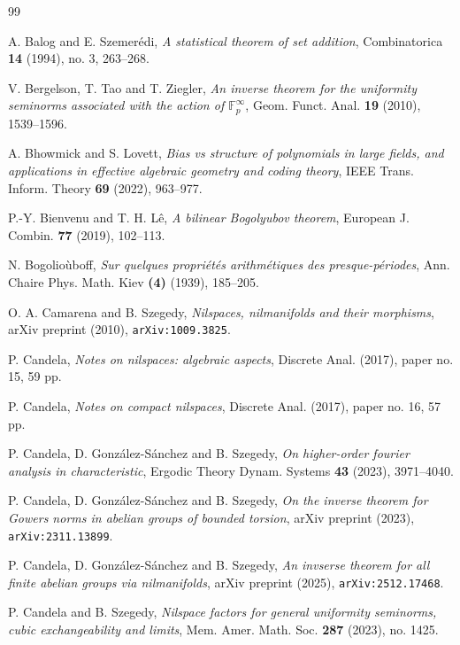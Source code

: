 \documentclass[a4paper,11pt]{article}
\numberwithin{theorem}{section}
\theoremstyle{definition}
\renewenvironment{thebibliography}[1]
{
  \begin{oldthebibliography}{#1}
    \setlength{\itemsep}{0em  plus 0.3ex}
    \setlength{\parskip}{0em}
}
{
  \end{oldthebibliography}
}
\begin{document}
\begin{thebibliography}{99}
 A. Balog and E. Szemer\'edi, \textit{A statistical theorem of set addition}, Combinatorica \textbf{14} (1994), no. 3, 263--268.

 V. Bergelson, T. Tao and T. Ziegler, \emph{An inverse theorem for the uniformity seminorms associated with the action of $\mathbb{F}_p^\infty$}, Geom. Funct. Anal. \textbf{19} (2010), 1539--1596.

 A. Bhowmick and S. Lovett, \emph{Bias vs structure of polynomials in large fields, and applications in effective algebraic geometry and coding theory}, IEEE Trans. Inform. Theory \textbf{69} (2022), 963--977. 

 P.-Y. Bienvenu and T. H. L\^{e}, \emph{A bilinear Bogolyubov theorem}, European J. Combin. \textbf{77} (2019), 102--113.

 N. Bogolio\`uboff, \textit{Sur quelques propri\'et\'es arithm\'etiques des presque-p\'eriodes}, Ann. Chaire Phys. Math. Kiev \textbf{(4)} (1939), 185--205.

 O. A. Camarena and B. Szegedy, \emph{Nilspaces, nilmanifolds and their morphisms}, arXiv preprint (2010), \verb+arXiv:1009.3825+.

 P. Candela, \emph{Notes on nilspaces: algebraic aspects}, Discrete Anal. (2017), paper no. 15, 59 pp.

 P. Candela, \emph{Notes on compact nilspaces}, Discrete Anal. (2017), paper no. 16, 57 pp.

 P. Candela, D. Gonz\'alez-S\'anchez and B. Szegedy, \emph{On higher-order fourier analysis in characteristic}, Ergodic Theory Dynam. Systems \textbf{43} (2023), 3971--4040.

 P. Candela, D. Gonz\'alez-S\'anchez and B. Szegedy, \textit{On the inverse theorem for Gowers norms in abelian groups of bounded torsion}, arXiv preprint (2023), \verb+arXiv:2311.13899+.

 P. Candela, D. Gonz\'alez-S\'anchez and B. Szegedy, \textit{An invserse theorem for all finite abelian groups via nilmanifolds}, arXiv preprint (2025), \verb+arXiv:2512.17468+.

P. Candela and B. Szegedy, \emph{Nilspace factors for general uniformity seminorms, cubic exchangeability and limits}, Mem. Amer. Math. Soc. \textbf{287} (2023), no. 1425.


\end{thebibliography}
\end{document}
